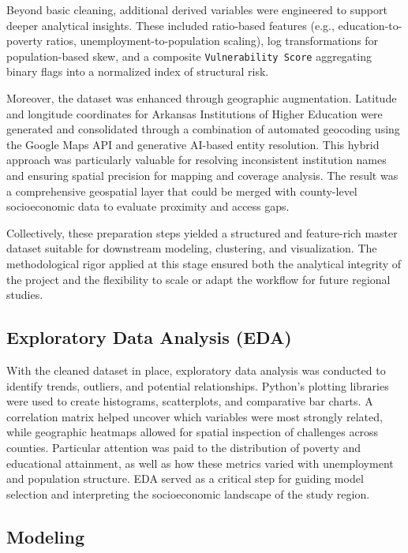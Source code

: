 \documentclass{llncs}
\begin{document}
Beyond basic cleaning, additional derived variables were engineered to support deeper analytical insights. These included ratio-based features (e.g., education-to-poverty ratios, unemployment-to-population scaling), log transformations for population-based skew, and a composite \texttt{Vulnerability Score} aggregating binary flags into a normalized index of structural risk.

Moreover, the dataset was enhanced through geographic augmentation. Latitude and longitude coordinates for Arkansas Institutions of Higher Education were generated and consolidated through a combination of automated geocoding using the Google Maps API and generative AI-based entity resolution. This hybrid approach was particularly valuable for resolving inconsistent institution names and ensuring spatial precision for mapping and coverage analysis. The result was a comprehensive geospatial layer that could be merged with county-level socioeconomic data to evaluate proximity and access gaps.

Collectively, these preparation steps yielded a structured and feature-rich master dataset suitable for downstream modeling, clustering, and visualization. The methodological rigor applied at this stage ensured both the analytical integrity of the project and the flexibility to scale or adapt the workflow for future regional studies.

\subsection{Exploratory Data Analysis (EDA)}
With the cleaned dataset in place, exploratory data analysis was conducted to identify trends, outliers, and potential relationships. Python’s plotting libraries were used to create histograms, scatterplots, and comparative bar charts. A correlation matrix helped uncover which variables were most strongly related, while geographic heatmaps allowed for spatial inspection of challenges across counties. Particular attention was paid to the distribution of poverty and educational attainment, as well as how these metrics varied with unemployment and population structure. EDA served as a critical step for guiding model selection and interpreting the socioeconomic landscape of the study region.

\subsection{Modeling} \label{subsec:modeling}
\end{document}
